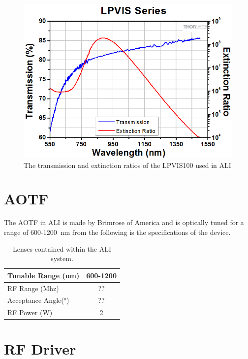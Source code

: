 \begin{figure}
    \includegraphics[width=1.0\textwidth]{./Images/A-2-PolarizerExtinctionRatio.png}
    \caption[Linear Polarizer Transmission and Extinction Ratios]{The transmission and extinction ratios of the LPVIS100 used in ALI}
    \label{fig:A.2:LinearPolarizer}
\end{figure}

\section{AOTF}

The AOTF in ALI is made by Brimrose of America and is optically tuned for a range of 600-1200~nm from the following is the specifications of the device.

\begin{table}
    \begin{center}
    \begin{tabular}{|l|c|}
    \hline
    Tunable Range (nm) & 600-1200 \\
    \hline
    RF Range (Mhz) & ?? \\
    \hline
    Acceptance Angle(\si{\degree}) & ?? \\
    \hline
    RF Power (W) & 2 \\
    \hline
    \end{tabular}
    \end{center}
    \caption[ALI System Lenses]{Lenses contained within the ALI system.}
    \label{tab:A.1:BrimroseAOTF}
\end{table}

\section{RF Driver}

